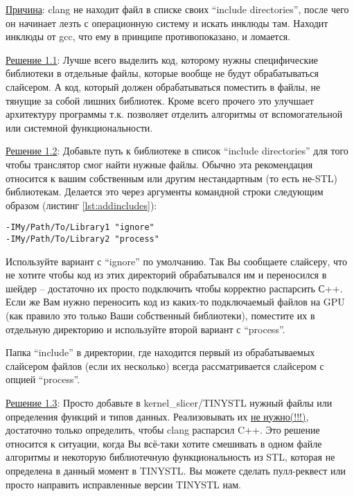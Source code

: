\documentclass[11pt,fleqn,english,russian]{report} %
\begin{document}
\noindent\underline{Причина}: clang не находит файл в списке своих ``include directories'', после чего он начинает лезть с операционную систему и искать инклюды там. Находит инклюды от gcc, что ему в принципе противопоказано, и ломается. 

\vspace*{5px}
\noindent\underline{Решение 1.1}: Лучше всего выделить код, которому нужны специфические библиотеки в отдельные файлы, которые вообще не будут обрабатываться слайсером. А код, который должен обрабатываться поместить в файлы, не тянущие за собой лишних библиотек. Кроме всего прочего это улучшает архитектуру программы т.к. позволяет отделить алгоритмы от вспомогательной или системной функциональности.

\vspace*{5px}
\noindent\underline{Решение 1.2}: Добавьте путь к библиотеке в список ``include directories'' для того чтобы транслятор смог найти нужные файлы. Обычно эта рекомендация относится к вашим собственным или другим нестандартным (то есть не-STL) библиотекам. Делается это через аргументы командной строки следующим образом (листинг \ref{lst:addincludes}):

\begin{lstlisting}[caption=добавляем новый подключаемый файл, 
	label=lst:addincludes]	
-IMy/Path/To/Library1 "ignore"
-IMy/Path/To/Library2 "process"
\end{lstlisting}

Используйте вариант с ``ignore'' по умолчанию. Так Вы сообщаете слайсеру, что не хотите чтобы код из этих директорий обрабатывался им и переносился в шейдер -- достаточно их просто подключить чтобы корректно распарсить С++. Если же Вам нужно переносить код из каких-то подключаемый файлов на GPU (как правило это только Ваши собственный библиотеки), поместите их в отдельную директорию и используйте второй вариант с ``process''.

\begin{remark}
Папка ``include'' в директории, где находится первый из обрабатываемых слайсером файлов (если их несколько) всегда рассматривается слайсером с опцией ``process''.
\end{remark}

\vspace*{5px}
\noindent\underline{Решение 1.3}: Просто добавьте в kernel\_slicer/TINYSTL нужный файлы или определения функций и типов данных. Реализовывать их \underline{не нужно(!!!)}, достаточно только определить, чтобы clang распарсил C++. Это решение относится к ситуации, когда Вы всё-таки хотите смешивать в одном файле алгоритмы и некоторую библиотечную функциональность из STL, которая не определена в данный момент в TINYSTL. Вы можете сделать пулл-реквест или просто направить исправленные версии TINYSTL нам.
\end{document}
